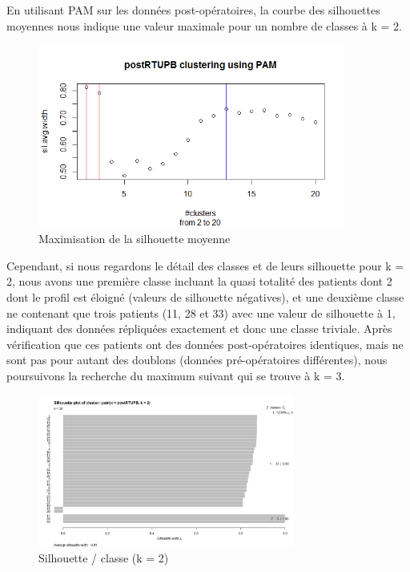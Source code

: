 %
%

En utilisant PAM sur les données post-opératoires, la courbe des silhouettes moyennes
nous indique une valeur maximale pour un nombre de classes à k = 2.

\begin{figure}[H]
\centering
\includegraphics[width=0.90\textwidth]{../Fig/RTUPB/rtupb-elbow-post.png}
\caption{Maximisation de la silhouette moyenne }
\end{figure}

Cependant, si nous regardons le détail des classes et de leurs silhouette pour k = 2,
nous avons une première classe incluant la quasi totalité des patients dont 2 dont le profil est éloigné (valeurs de silhouette négatives), et une deuxième classe ne contenant que trois patients (11, 28 et 33)
avec une valeur de silhouette à 1, indiquant des données répliquées exactement et donc une classe triviale.
Après vérification que ces patients ont des données post-opératoires identiques, mais ne sont pas pour autant
des doublons (données pré-opératoires différentes), nous poursuivons la recherche du maximum suivant qui se trouve à k = 3.

\begin{figure}[H]
\centering
\includegraphics[width=0.75\textwidth]{../Fig/RTUPB/rtupb-sil-k2-post.png}
\caption{Silhouette / classe (k = 2) }
\end{figure}


